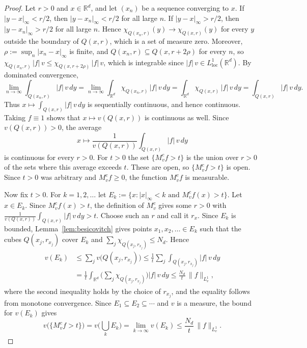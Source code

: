 \documentclass[12pt]{article}
\begin{document}
\begin{proof}
Let $r > 0$ and $x \in \mathbb{R}^d$, and let $(x_n)$ be a sequence converging to $x$. If $|y - x|_\infty < r/2$, then $|y - x_n|_\infty < r/2$ for all large $n$. If $|y - x|_\infty > r/2$, then $|y - x_n|_\infty > r/2$ for all large $n$. Hence $\chi_{Q(x_n, r)}(y) \to \chi_{Q(x, r)}(y)$ for every $y$ outside the boundary of $Q(x, r)$, which is a set of measure zero. Moreover, $\rho := \sup_n |x_n - x|_\infty$ is finite, and $Q(x_n, r) \subseteq Q(x, r + 2\rho)$ for every $n$, so $\chi_{Q(x_n, r)}\,|f|\,v \le \chi_{Q(x, r+2\rho)}\,|f|\,v$, which is integrable since $|f|\,v \in L^1_{\mathrm{loc}}(\mathbb{R}^d)$. By dominated convergence,
\[
  \lim_{n\to\infty} \int_{Q(x_n, r)} |f|\, v\,dy = \lim_{n\to\infty} \int_{\mathbb{R}^d} \chi_{Q(x_n, r)}\,|f|\, v\,dy = \int_{\mathbb{R}^d} \chi_{Q(x, r)}\,|f|\, v\,dy = \int_{Q(x, r)} |f|\, v\,dy .
\]
Thus $x \mapsto \int_{Q(x,r)} |f|\,v\,dy$ is sequentially continuous, and hence continuous. Taking $f \equiv 1$ shows that $x \mapsto v(Q(x,r))$ is continuous as well. Since $v(Q(x,r)) > 0$, the average
\[
  x \mapsto \frac{1}{v(Q(x,r))} \int_{Q(x,r)} |f|\, v\,dy
\]
is continuous for every $r > 0$. For $t > 0$ the set $\{M^c_v f > t\}$ is the union over $r > 0$ of the sets where this average exceeds $t$. These are open, so $\{M^c_v f > t\}$ is open. Since $t > 0$ was arbitrary and $M^c_v f \ge 0$, the function $M^c_v f$ is measurable.

Now fix $t > 0$. For $k = 1, 2, \ldots$ let $E_k := \{x : |x|_\infty < k \text{ and } M^c_v f(x) > t\}$. Let $x \in E_k$. Since $M^c_v f(x) > t$, the definition of $M^c_v$ gives some $r > 0$ with $\frac{1}{v(Q(x,r))}\int_{Q(x,r)} |f|\,v\,dy > t$. Choose such an $r$ and call it $r_x$. Since $E_k$ is bounded, Lemma~\ref{lem:besicovitch} gives points $x_1, x_2, \ldots \in E_k$ such that the cubes $Q(x_j, r_{x_j})$ cover $E_k$ and $\sum_j \chi_{Q(x_j, r_{x_j})} \le N_d$. Hence
\begin{align*}
  v(E_k) &\le \sum_j v\big(Q(x_j, r_{x_j})\big) \le \frac{1}{t} \sum_j \int_{Q(x_j, r_{x_j})} |f|\, v\,dy \\
  &= \frac{1}{t} \int_{\mathbb{R}^d} \Big( \sum_j \chi_{Q(x_j, r_{x_j})} \Big) |f|\, v\,dy \le \frac{N_d}{t}\, \|f\|_{L^1_v},
\end{align*}
where the second inequality holds by the choice of $r_{x_j}$, and the equality follows from monotone convergence. Since $E_1 \subseteq E_2 \subseteq \cdots$ and $v$ is a measure, the bound for $v(E_k)$ gives
\[
  v\big(\{M^c_v f > t\}\big) = v\Big(\bigcup_k E_k\Big) = \lim_{k\to\infty} v(E_k) \le \frac{N_d}{t}\,\|f\|_{L^1_v}.
\]
\end{proof}
\end{document}
